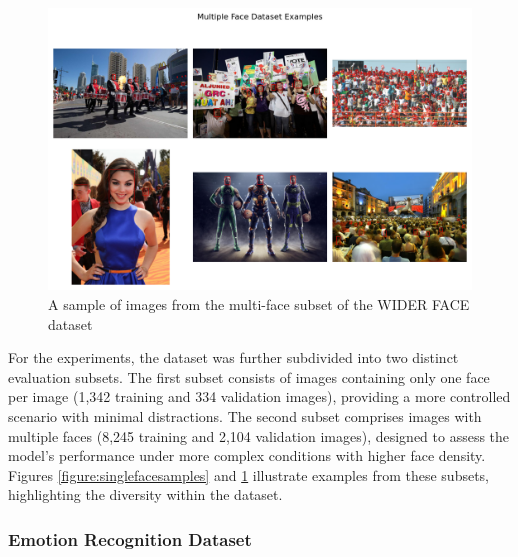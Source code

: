 \begin{figure}[!htb]
    \centering{}
    \includegraphics[scale=0.35]{m+m_images/multi_face_figure_samples.png}
    \caption{A sample of images from the multi-face subset of the WIDER FACE dataset}
    \label{figure:multifacesamples}
\end{figure}

For the experiments, the dataset was further subdivided into two distinct evaluation subsets. The first subset consists of images containing only one face per image (1,342 training and 334 validation images), providing a more controlled scenario with minimal distractions. The second subset comprises images with multiple faces (8,245 training and 2,104 validation images), designed to assess the model's performance under more complex conditions with higher face density. Figures \ref{figure:singlefacesamples} and \ref{figure:multifacesamples} illustrate examples from these subsets, highlighting the diversity within the dataset.

\subsubsection{Emotion Recognition Dataset}


